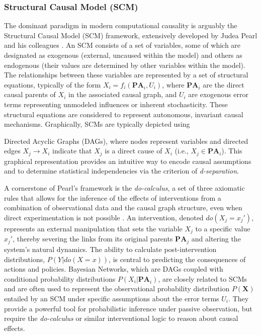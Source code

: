 \subsubsection{Structural Causal Model (SCM)}

The dominant paradigm in modern computational causality is arguably the Structural Causal Model (SCM) framework, extensively developed by Judea Pearl and his colleagues \cite{Pearl2009Causality}. An SCM consists of a set of variables, some of which are designated as exogenous (external, uncaused within the model) and others as endogenous (their values are determined by other variables within the model). The relationships between these variables are represented by a set of structural equations, typically of the form $X_i = f_i(\mathbf{PA}_i, U_i)$, where $\mathbf{PA}_i$ are the direct causal parents of $X_i$ in the associated causal graph, and $U_i$ are exogenous error terms representing unmodeled influences or inherent stochasticity. These structural equations are considered to represent autonomous, invariant causal mechanisms. Graphically, SCMs are typically depicted using {Directed Acyclic Graphs (DAGs), where nodes represent variables and directed edges $X_j \to X_i$ indicate that $X_j$ is a direct cause of $X_i$ (i.e., $X_j \in \mathbf{PA}_i$). This graphical representation provides an intuitive way to encode causal assumptions and to determine statistical independencies via the criterion of \textit{d-separation}.

A cornerstone of Pearl's framework is the \textit{do-calculus}, a set of three axiomatic rules that allows for the inference of the effects of interventions from a combination of observational data and the causal graph structure, even when direct experimentation is not possible \cite{Pearl2009Causality}. An intervention, denoted $do(X_j=x_j')$, represents an external manipulation that sets the variable $X_j$ to a specific value $x_j'$, thereby severing the links from its original parents $\mathbf{PA}_j$ and altering the system's natural dynamics. The ability to calculate post-intervention distributions, $P(Y | do(X=x))$, is central to predicting the consequences of actions and policies. Bayesian Networks, which are DAGs coupled with conditional probability distributions $P(X_i | \mathbf{PA}_i)$, are closely related to SCMs and are often used to represent the observational probability distribution $P(\mathbf{X})$ entailed by an SCM under specific assumptions about the error terms $U_i$. They provide a powerful tool for probabilistic inference under passive observation, but require the \textit{do-calculus} or similar interventional logic to reason about causal effects.

}
